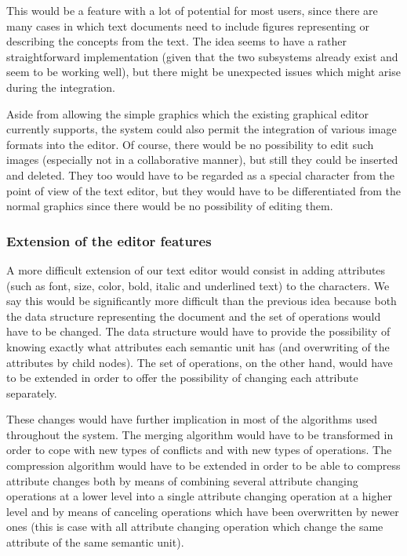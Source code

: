 This would be a feature with a lot of potential for most users, since there are many cases in
which text documents need to include figures representing or describing the concepts from the
text. The idea seems to have a rather straightforward implementation (given that the two subsystems
already exist and seem to be working well), but there might be unexpected issues which might arise
during the integration.

Aside from allowing the simple graphics which the existing graphical editor currently supports,
the system could also permit the integration of various image formats into the editor. Of course,
there would be no
possibility to edit such images (especially not in a collaborative manner), but still they
could be inserted and deleted. They too would have to be regarded as a special character from
the point of view of the text editor, but they would have to be differentiated from the normal
graphics since there would be no possibility of editing them.

\subsubsection{Extension of the editor features}

A more difficult extension of our text editor would consist in adding attributes (such as
font, size, color, bold, italic and underlined text) to the characters. We say this would
be significantly more difficult than
the previous idea because both the data structure representing the document and the set of
operations would have to be changed. The data structure would have to provide the possibility
of knowing exactly what attributes each semantic unit has (and overwriting of the attributes
by child nodes). The set of operations, on the other hand, would have to be extended in order
to offer the possibility of changing each attribute separately.

These changes would have further implication in most of the algorithms used throughout the
system. The merging algorithm would have to be transformed in order to cope with new types
of conflicts and with new types of operations. The compression algorithm would have to be
extended in order to be able to compress attribute changes both by means of combining several
attribute changing operations at a lower level into a single attribute changing operation at
a higher level and by means of canceling operations which have been overwritten by newer
ones (this is case with all attribute changing operation which change the same attribute of
the same semantic unit).

